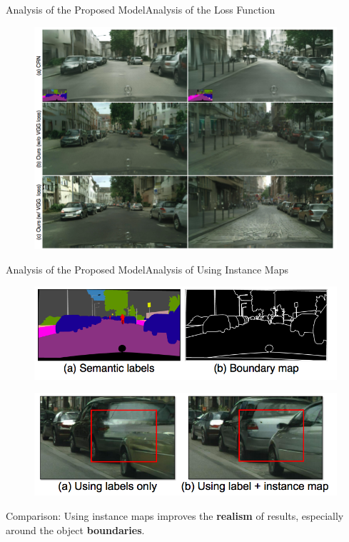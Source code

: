 \documentclass{beamer}
\begin{document}
\begin{frame}{Analysis of the  Proposed Model}{Analysis of the Loss Function}
\begin{figure}
	\centering
	\includegraphics[height=0.8\textheight]{images/result_3}
\end{figure}
\end{frame}

\begin{frame}{Analysis of  the Proposed Model}{Analysis of  Using Instance Maps}
	\begin{figure}
		\centering
		\includegraphics[height=0.25\textheight]{images/instance_maps}
	\end{figure}
\begin{figure}
	\centering
	\includegraphics[height=0.3\textheight]{images/instance_result}
\end{figure}
%
%
\begin{beamerboxesrounded}[upper=uppercol,lower=lowercol,shadow=false]{Comparison: }
Using instance maps improves the \textbf{realism} of  results, especially around the object \textbf{boundaries}.
\end{beamerboxesrounded}
\end{frame}
\end{document}
